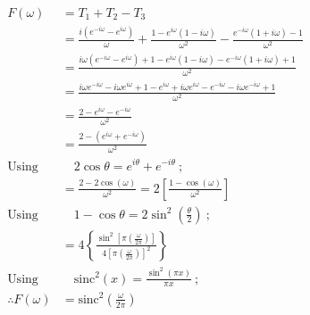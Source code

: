 \documentclass[preview]{standalone}
\begin{document}
\begin{align*}
F(\omega)&=T_{1}+T_{2}-T_{3} \\ &=\frac{i(e^{-i\omega}-e^{i\omega})}{\omega}+\frac{1-e^{i\omega}(1-i\omega)}{\omega^{2}}-\frac{e^{-i\omega}(1+i\omega)-1}{\omega^{2}} \\ &=\frac{i\omega(e^{-i\omega}-e^{i\omega})+1-e^{i\omega}(1-i\omega)-e^{-i\omega}(1+i\omega)+1}{\omega^{2}} \\ &=\frac{i\omega e^{-i\omega}-i\omega e^{i\omega}+1-e^{i\omega}+i\omega e^{i\omega}-e^{-i\omega}-i\omega e^{-i\omega}+1}{\omega^{2}} \\ &=\frac{2-e^{i\omega} - e^{-i\omega}}{\omega^{2}} \\ &=\frac{2-(e^{i\omega}+e^{-i\omega})}{\omega^{2}} \quad \\ \textrm{Using}& \quad 2\cos{\theta}=e^{i\theta}+e^{-i\theta} \ ; \\ &=\frac{2-2\cos{(\omega)}}{\omega^{2}} = 2\left[\frac{1-\cos{(\omega)}}{\omega^{2}}\right] \\ \textrm{Using}& \quad 1-\cos{\theta}=2\sin^{2}{\left( \frac{\theta}{2} \right) } \ ; \\ &=4\left\{ \frac{\sin^{2}{\left[ \pi \left( \frac{\omega}{2\pi} \right) \right]}}{4\left[ \pi \left( \frac{\omega}{2\pi} \right) \right]^{2} } \right\} \\ \textrm{Using}& \quad \textrm{sinc}^{2}(x)=\frac{\sin^{2}{(\pi x)}}{\pi x} \ ;\\ \therefore F(\omega)&=\textrm{sinc}^{2}\left( \frac{\omega}{2\pi} \right)
\end{align*}
\end{document}
